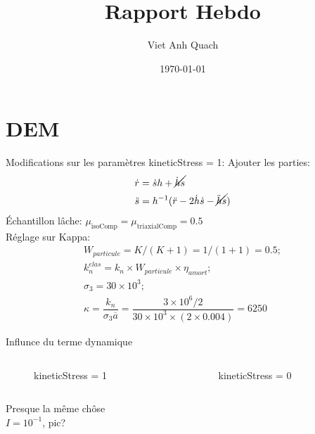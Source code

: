 \documentclass[10pt]{beamer}
\title{Rapport Hebdo}
\author{Viet Anh Quach}
\institute{3SR}
\date{\today}
\begin{document}
\begin{frame}
    \titlepage
\end{frame}


\section{DEM}

\begin{frame}{Modifications sur les paramètres}
    kineticStress = 1: Ajouter les parties:
    \begin{align*}
    \dot{r} &= \dot{s}h + \cancel{\dot{h}s} \\
    \ddot{s} &= h^{-1}(\ddot{r} - 2\dot{h}\dot{s} - \cancel{\ddot{h}s})
    \end{align*}
    Échantillon lâche: $ \mu_{\text{isoComp}} = \mu_{\text{triaxialComp}} = 0.5$ \\
    Réglage sur Kappa:
    \begin{align*}
            W_{particule} = K / (K + 1) = 1 / (1 + 1) = 0.5; \\
            k_n^{elas} = k_n \times W_{particule} \times \eta_{amort}; \\
            \sigma_3 = 30 \times 10^3; \\
    \kappa = \dfrac{k_n}{\sigma_3 \overline{a}} = \dfrac{3\times10^{6}/2}{30\times10^{3} \times (2 \times 0.004)} = 6250
\end{align*}

\end{frame}

\begin{frame}{Influnce du terme dynamique}
    \begin{columns}
        \begin{column}{0.5\textwidth}
            \begin{figure}[h]
                \centering
                \scalebox{0.5}{}
                \caption{kineticStress = 1}
            \end{figure}
        \end{column}
        \begin{column}{0.5\textwidth}
            \begin{figure}[h]
                \centering
                \scalebox{0.5}{}
                \caption{kineticStress = 0}
            \end{figure}
        \end{column}
    \end{columns}
    Presque la même chôse\\
    $I = 10^{-1}$, pic?
\end{frame}
\end{document}
